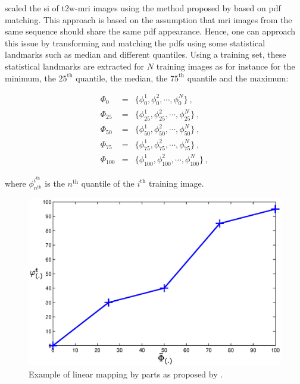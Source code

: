 \begin{enumerate}[leftmargin=*]
\cite{Lv2009} scaled the \ac{si} of \ac{t2w}-\ac{mri} images using the method proposed by \cite{Nyul2000} based on \ac{pdf} matching. This approach is based on the assumption that \ac{mri} images from the same sequence should share the same \ac{pdf} appearance. Hence, one can approach this issue by transforming and matching the \acp{pdf} using some statistical landmarks such as median and different quantiles. Using a training set, these statistical landmarks are extracted for $N$ training images as for instance for the minimum, the $25^{\text{th}}$ quantile, the median, the $75^{\text{th}}$ quantile and the maximum:

\begin{eqnarray}	
	\Phi_{0} & = & \{ \phi_{0}^{1}, \phi_{0}^{2}, \cdots, \phi_{0}^{N} \} \ , \nonumber \\
	\Phi_{25} & = & \{ \phi_{25}^{1}, \phi_{25}^{2}, \cdots, \phi_{25}^{N} \} \ , \nonumber \\
	\Phi_{50} & = & \{ \phi_{50}^{1}, \phi_{50}^{2}, \cdots, \phi_{50}^{N} \} \ ,  \label{eq:quantileStd} \\
	\Phi_{75} & = & \{ \phi_{75}^{1}, \phi_{75}^{2}, \cdots, \phi_{75}^{N} \} \ , \nonumber \\
	\Phi_{100} & = & \{ \phi_{100}^{1}, \phi_{100}^{2}, \cdots, \phi_{100}^{N} \} \ , \nonumber
\end{eqnarray}

\noindent where $\phi_{n^\text{th}}^{i^{\text{th}}}$ is the $n^{\text{th}}$ quantile of the $i^{\text{th}}$ training image.

\begin{figure}
	\centering
	\includegraphics[width=0.9\linewidth]{03_image_processing/03_preprocessing/figures/normalization/linear_transform_parts.eps}
	\caption{Example of linear mapping by parts as proposed by \cite{Nyul2000}.}
	\label{fig:imnorm}
\end{figure}


\end{enumerate}
